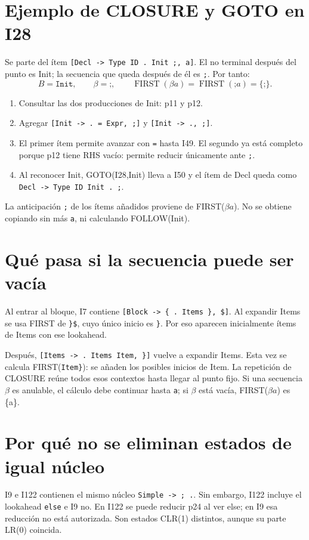 \section*{Ejemplo de CLOSURE y GOTO en I28}
Se parte del ítem \texttt{[Decl -> Type ID . Init ;, a]}. El no terminal después del punto es Init; la secuencia que queda después de él es \texttt{;}. Por tanto:
\[
B=\texttt{Init},\qquad\beta=\texttt{;},\qquad
\operatorname{FIRST}(\beta a)=\operatorname{FIRST}(\texttt{;}a)=\{\texttt{;}\}.
\]
\begin{enumerate}
\item Consultar las dos producciones de Init: p11 y p12.
\item Agregar \texttt{[Init -> . = Expr, ;]} y \texttt{[Init -> ., ;]}.
\item El primer ítem permite avanzar con \texttt{=} hasta I49. El segundo ya está completo porque p12 tiene RHS vacío: permite reducir únicamente ante \texttt{;}.
\item Al reconocer Init, GOTO(I28,Init) lleva a I50 y el ítem de Decl queda como \texttt{Decl -> Type ID Init . ;}.
\end{enumerate}
La anticipación \texttt{;} de los ítems añadidos proviene de FIRST($\beta a$). No se obtiene copiando sin más \texttt{a}, ni calculando FOLLOW(Init).
\section*{Qué pasa si la secuencia puede ser vacía}
Al entrar al bloque, I7 contiene \texttt{[Block -> \{ . Items \}, \$]}. Al expandir Items se usa FIRST de \texttt{\}\$}, cuyo único inicio es \texttt{\}}. Por eso aparecen inicialmente ítems de Items con ese lookahead.

Después, \texttt{[Items -> . Items Item, \}]} vuelve a expandir Items. Esta vez se calcula FIRST(\texttt{Item}\texttt{\}}): se añaden los posibles inicios de Item. La repetición de CLOSURE reúne todos esos contextos hasta llegar al punto fijo. Si una secuencia $\beta$ es anulable, el cálculo debe continuar hasta \texttt{a}; si $\beta$ está vacía, FIRST($\beta a$) es \{a\}.
\section*{Por qué no se eliminan estados de igual núcleo}
I9 e I122 contienen el mismo núcleo \texttt{Simple -> ; .}. Sin embargo, I122 incluye el lookahead \texttt{else} e I9 no. En I122 se puede reducir p24 al ver else; en I9 esa reducción no está autorizada. Son estados CLR(1) distintos, aunque su parte LR(0) coincida.
